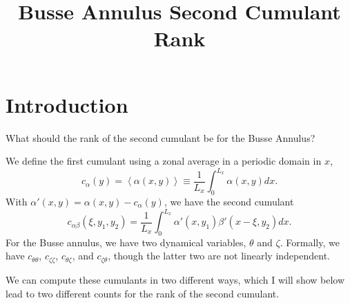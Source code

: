 \documentclass[11pt]{article}
\title{Busse Annulus Second Cumulant Rank}
\begin{document}
\maketitle

\section{Introduction}
\label{sec:intro}

What should the rank of the second cumulant be for the Busse Annulus?

We define the first cumulant using a zonal average in a periodic domain in $x$,
\begin{equation}
  \label{eq:first_c}
  c_\alpha(y) = \left< \alpha(x, y)\right> \equiv \frac{1}{L_x} \int_0^{L_x} \alpha(x, y) dx.
\end{equation}
With $\alpha'(x, y) = \alpha(x, y) - c_\alpha(y)$, we have the second cumulant 
\begin{equation}
  \label{eq:second_c}
  c_{\alpha \beta}(\xi, y_1, y_2) = \frac{1}{L_x} \int_0^{L_x} \alpha'(x, y_1) \beta'(x-\xi, y_2) dx.
\end{equation}
For the Busse annulus, we have two dynamical variables, $\theta$ and $\zeta$.
Formally, we have $c_{\theta \theta}$, $c_{\zeta \zeta}$, $c_{\theta \zeta}$, and $c_{\zeta \theta}$, though the latter two are not linearly independent.

We can compute these cumulants in two different ways, which I will show below lead to two different counts for the rank of the second cumulant.
\end{document}
